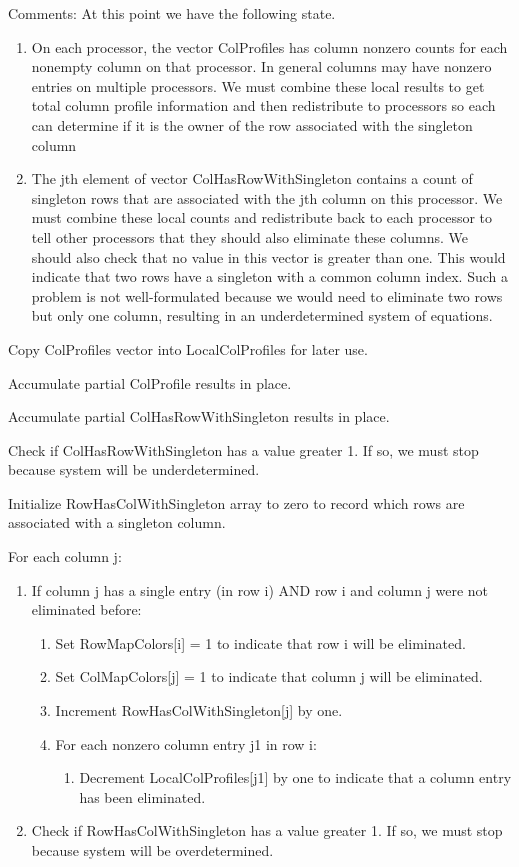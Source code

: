 \begin{enumerate}
\begin{enumerate}
\end{enumerate}
\item Comments: At this point we have the following state.
\begin{enumerate}
\item On each processor, the vector ColProfiles has column nonzero counts for each 
nonempty column on that processor.  In general columns may have nonzero entries on
multiple processors. We must combine these local results
to get total column profile information and 
then redistribute to processors so each can determine if it is the owner of the 
row associated with the singleton column 
\item The jth element of vector ColHasRowWithSingleton contains a count of singleton 
rows that are associated with the jth column on this processor.  We must combine these
local counts and redistribute back to each processor to tell other processors that they 
should also eliminate these columns.  We should also check that no value in this vector is
greater than one.  This would indicate that two rows have a singleton with a common column
index.  Such a problem is not well-formulated because we would need to eliminate two rows
but only one column, resulting in an underdetermined system of equations.
\end{enumerate}

\item Copy ColProfiles vector into LocalColProfiles for later use.
\item Accumulate partial ColProfile results in place.
\item Accumulate partial ColHasRowWithSingleton results in place.
\item Check if ColHasRowWithSingleton has a value greater 1.  If so, we must stop because
system will be underdetermined.
\item Initialize RowHasColWithSingleton array to zero to record which rows are associated
with a singleton column.
\item For each column j:
\begin{enumerate}
\item If column j has a single entry (in row i) AND row i and column j were not eliminated
before:
\begin{enumerate}
\item Set RowMapColors[i] = 1 to indicate that row i will be eliminated.
\item Set ColMapColors[j] = 1 to indicate that column j will be eliminated.
\item Increment RowHasColWithSingleton[j] by one.
\item For each nonzero column entry j1 in row i:
\begin{enumerate}
\item Decrement LocalColProfiles[j1] by one to indicate that a column entry has been
eliminated.
\end{enumerate}
\end{enumerate}
\item Check if RowHasColWithSingleton has a value greater 1.  If so, we must stop because
system will be overdetermined.
\end{enumerate}
